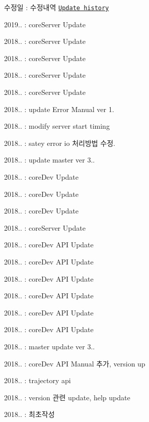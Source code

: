 \begin{DoxyItemize}
\item 수정일 \-: 수정내역 \href{file:update_history.html}{\tt Update history}
\item 2019.. \-: core\-Server Update
\item 2018.. \-: core\-Server Update
\item 2018.. \-: core\-Server Update
\item 2018.. \-: core\-Server Update
\item 2018.. \-: core\-Server Update
\item 2018.. \-: update Error Manual ver 1.
\item 2018.. \-: modify server start timing
\item 2018.. \-: satey error io 처리방법 수정.
\item 2018.. \-: update master ver 3..
\item 2018.. \-: core\-Dev Update
\item 2018.. \-: core\-Dev Update
\item 2018.. \-: core\-Dev Update
\item 2018.. \-: core\-Server Update
\item 2018.. \-: core\-Dev A\-P\-I Update
\item 2018.. \-: core\-Dev A\-P\-I Update
\item 2018.. \-: core\-Dev A\-P\-I Update
\item 2018.. \-: core\-Dev A\-P\-I Update
\item 2018.. \-: core\-Dev A\-P\-I Update
\item 2018.. \-: core\-Dev A\-P\-I Update
\item 2018.. \-: master update ver 3..
\item 2018.. \-: core\-Dev A\-P\-I Manual 추가, version up
\item 2018.. \-: trajectory api
\item 2018.. \-: version 관련 update, help update
\item 2018.. \-: 최초작성 
\end{DoxyItemize}